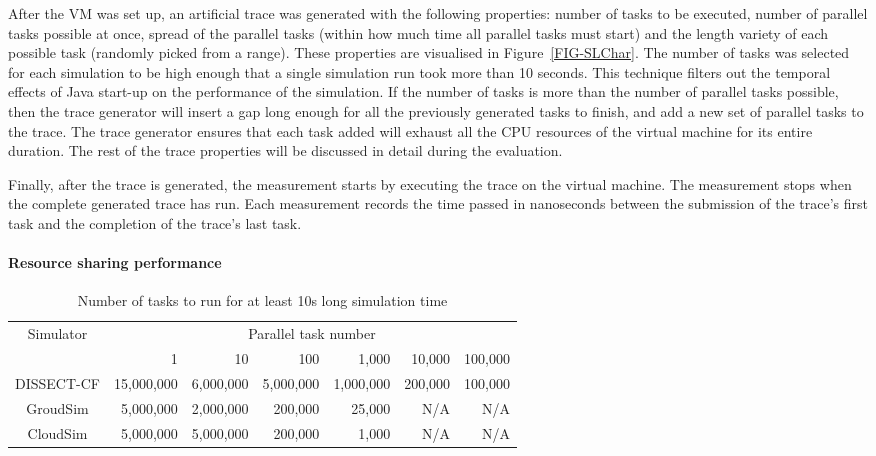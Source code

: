 \documentclass[sort, compress, 5p]{elsarticle}
\begin{document}
After the VM was set up, an artificial trace was generated with the following properties:  number of tasks to be executed,  number of parallel tasks possible at once,  spread of the parallel tasks (within how much time all parallel tasks must start) and  the length variety of each possible task (randomly picked from a range). These properties are visualised in Figure~\ref{FIG-SLChar}. The number of tasks was selected for each simulation to be high enough that a single simulation run took more than 10 seconds. This technique filters out the temporal effects of Java start-up on the performance of the simulation. If the number of tasks is more than the number of parallel tasks possible, then the trace generator will insert a gap long enough for all the previously generated tasks to finish, and add a new set of parallel tasks to the trace. The trace generator ensures that each task added will exhaust all the CPU resources of the virtual machine for its entire duration. The rest of the trace properties will be discussed in detail during the evaluation.

Finally, after the trace is generated, the measurement starts by executing the trace on the virtual machine. The measurement stops when the complete generated trace has run. Each measurement records the time passed in nanoseconds between the submission of the trace's first task and the completion of the trace's last task.

\paragraph{Resource sharing performance}

\begin{table*}[tb]
\centering
\caption{Number of tasks to run for at least 10s long simulation time\label{TAB-TASKDISTRS}}
\begin{tabular}{c|rrrrrr}
\hline
\multirow{2}{*}{Simulator}& \multicolumn{6}{c}{Parallel task number}\\
& 1 & 10 & 100 & 1,000 & 10,000 & 100,000\\
\hline
DISSECT-CF & 15,000,000 & 6,000,000 & 5,000,000 & 1,000,000 & 200,000 & 100,000\\
GroudSim & 5,000,000 & 2,000,000 & 200,000 & 25,000 & N/A & N/A\\
CloudSim & 5,000,000 & 5,000,000 & 200,000 & 1,000 & N/A & N/A\\
\hline
\end{tabular}
\end{table*}
\end{document}
